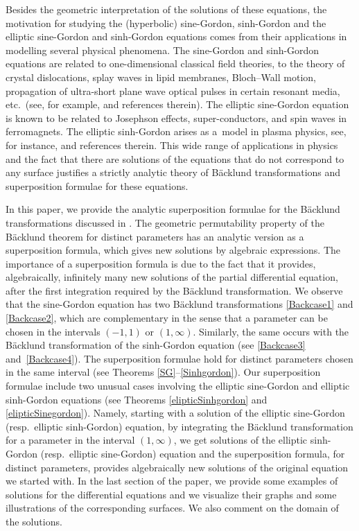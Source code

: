 \documentclass[pdftex]{sigma}
\numberwithin{equation}{section}
\begin{document}
Besides the geometric interpretation of the solutions of these equations, the motivation for studying the (hyperbolic) sine-Gordon, sinh-Gordon and the elliptic sine-Gordon and sinh-Gordon equations comes from their applications in modelling several physical phenomena. The sine-Gordon and sinh-Gordon equations are related to one-dimensional classical field theories, to the theory of crystal dislocations, splay waves in lipid membranes, Bloch--Wall motion, propagation of ultra-short plane wave optical pulses in certain resonant media, etc.\ (see, for example, \cite{AKNS} and
references therein). The elliptic sine-Gordon equation is known to be related to Josephson effects, super-conductors, and spin waves in ferromagnets. The elliptic sinh-Gordon arises as a~model in plasma physics, see, for instance, \cite{FokasLenPelloni, GutLip,JawKaup, Pelloni} and references therein.
This wide range of applications in physics and the fact that there are solutions of the equations that do not correspond to any surface justifies a strictly analytic theory of B\"acklund transformations and superposition formulae for these equations.

In this paper, we provide the analytic superposition formulae for
the B\"acklund transformations discussed in \cite{KRT2022}. The geometric permutability property of the B\"acklund theorem for distinct parameters has an analytic version as a superposition formula, which gives new solutions by algebraic expressions. The importance of a superposition formula is due to the fact that it provides, algebraically, infinitely many new solutions of the partial differential equation, after the first integration required by the B\"acklund transformation.
We observe that the sine-Gordon equation has two B\"acklund transformations \eqref{Backcase1} and \eqref{Backcase2}, which are complementary in the sense that a parameter can be chosen in the intervals $(-1,1)$ or $(1,\infty)$. Similarly, the same occurs with the B\"acklund transformation of the sinh-Gordon equation (see \eqref{Backcase3} and~\eqref{Backcase4}). The superposition formulae hold for distinct parameters chosen in the same interval (see Theorems \ref{SG}--\ref{Sinhgordon}).
 Our superposition formulae include two unusual cases involving the elliptic sine-Gordon and elliptic sinh-Gordon equations
 (see Theorems \ref{elipticSinhgordon} and \ref{elipticSinegordon}). Namely, starting with a solution of the elliptic sine-Gordon (resp.\ elliptic sinh-Gordon) equation, by integrating the B\"acklund transformation for a parameter in the
 interval $(1,\infty)$, we get solutions of the elliptic sinh-Gordon (resp.\ elliptic sine-Gordon) equation and the superposition formula, for distinct parameters, provides algebraically new solutions of the original equation we started with. In the last section of the paper, we provide some examples of solutions for the differential equations and we visualize their graphs and some illustrations of the corresponding surfaces. We also comment on the domain of the solutions.
\end{document}
